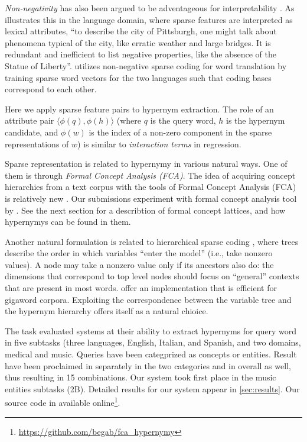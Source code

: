 \documentclass[11pt,a4paper]{article}
\begin{document}
\emph{Non-negativity} has also been argued to be adventageous for interpretability
\citep{Faruqui:2015,Fyshe:2015,Arora:2016}. As \citet{Subramanian:2018}
illustrates this in the language domain, where sparse features are interpreted
as lexical attributes, ``to describe the city of Pittsburgh, one might talk
about phenomena typical of the city, like erratic weather and large bridges. It
is redundant and inefficient to list negative properties, like the absence of
the Statue of Liberty''.  
\citet{Berend:2018} utilizes non-negative sparse coding for word translation by
training sparse word vectors for the two languages such that coding bases
correspond to each other. 

Here we apply sparse feature pairs to hypernym extraction. The role of an
attribute pair $\langle \phi(q),\phi(h)\rangle$ (where $q$ is the query word,
$h$ is the hypernym candidate, and $\phi(w)$ is the index of a non-zero
component in the sparse representations of $w$) is similar to \emph{interaction
terms} in regression.

Sparse representation is related to hypernymy in various natural ways.  One of
them is through \emph{Formal Concept Analysis (FCA)}.  The idea of acquiring concept
hierarchies from a text corpus with the tools of Formal Concept Analysis (FCA)
is relatively new \citep{Cimiano:2005}.
Our submissions experiment with formal concept analysis tool by
\citet{Endres:2010}. See the next section for a describtion of formal concept
lattices, and how hypernymys can be found in them.

Another natural formulation is related to hierarchical sparse coding
\citep{Zhao:2009}, where trees describe the order in which variables “enter the
model” (i.e., take nonzero values). A node may take a nonzero value only if its
ancestors also do: the dimensions that correspond to top level nodes should
focus on “general” contexts that are present in most words.
\citet{Yogatama:2015} offer an implementation that is efficient for gigaword
corpora. Exploiting the correspondence between the variable tree and the
hypernym hierarchy offers itself as a natural chioice.

The task \citep{Camacho-Collados:2018} evaluated systems at their ability to
extract hypernyms for query word in five subtasks (three languages, English,
Italian, and Spanish, and two domains, medical and music. Queries have been
categprized as concepts or entities. Result have been proclaimed in separately
in the two categories and in overall as well, thus resulting in 15
combinations.
Our system took first place in the music entities subtasks (2B).
Detailed results for our system appear in \autoref{sec:results}.
Our source code in available online\footnote{\url{https://github.com/begab/fca_hypernymy}}.
\end{document}
